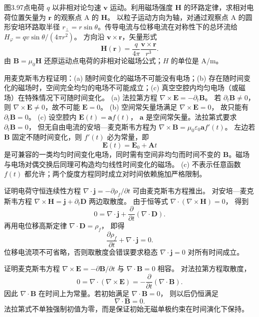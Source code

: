 图3.97点电荷 $q$ 以非相对论匀速 $\bm v$ 运动。利用磁场强度 $\bm H$ 的环路定律，求相对电荷位置矢量为 $\bm r$ 的观察点 A 的 $\bm H$。
\exsolution
以粒子运动方向为轴，对通过观察点 A 的圆形安培环路取半径 $r_\perp=r\sin\theta$。传导电流与位移电流在对称性下的总环流给
$H_\varphi=qv\sin\theta/(4\pi r^2)$。
方向沿 $\bm v\times\bm r$，矢量形式
\[
\boxed{\bm H(\bm r)=\frac{q}{4\pi}
\frac{\bm v\times\bm r}{r^3}}.
\]
\excheck 由 $\bm B=\mu_0\bm H$ 还原运动点电荷的非相对论磁场公式；$H$ 的单位是 A/m。

用麦克斯韦方程证明：(a) 随时间变化的磁场不可能没有电场；(b) 存在随时间变化的磁场时，空间完全均匀的电场不可能成立；(c) 真空空腔内均匀电场（或磁场）在特殊情况下可随时间变化。
\exsolution
(a) 法拉第方程
$\nabla\times\bm E=-\partial_t\bm B$。
若 $\partial_t\bm B\ne0$，则
$\nabla\times\bm E\ne0$，故不可能 $\bm E=0$。
(b) 空间常矢量场满足 $\nabla\times\bm E=0$，
故只能有 $\partial_t\bm B=0$。
(c) 设空腔内 $\bm E(t)=\bm a f(t)$，
$\bm a$ 是空间常矢量。法拉第式要求
$\partial_t\bm B=0$，
但无自由电流的安培—麦克斯韦方程为
$\nabla\times\bm B=\mu_0\varepsilon_0\bm a f'(t)$。
左边若 $\bm B$ 固定不随时间变化，则 $f'(t)$ 必为常量，即
\[
\boxed{\bm E(t)=\bm E_0+\bm A t}
\]
是可兼容的一类均匀时间变化电场，同时需有空间非均匀而时间不变的 $\bm B$。磁场与电场对偶交换后同理可构造均匀线性时间变化的磁场。
\excheck (c) 不表示任意函数 $f(t)$ 都允许；两个旋度方程同时成立对时间依赖施加严格限制。

证明电荷守恒连续性方程
$\nabla\cdot\bm j=-\partial\rho_f/\partial t$
可由麦克斯韦方程推出。
\exsolution
对安培—麦克斯韦方程
$\nabla\times\bm H=\bm j+\partial_t\bm D$
两边取散度。
由于恒等式
$\nabla\cdot(\nabla\times\bm H)=0$，
得到
\[
0=\nabla\cdot\bm j+
\frac{\partial}{\partial t}(\nabla\cdot\bm D).
\]
再用电位移高斯定律
$\nabla\cdot\bm D=\rho_f$，
即得
\[
\boxed{\frac{\partial\rho_f}{\partial t}
+\nabla\cdot\bm j=0}.
\]
\excheck 位移电流项不可省略，否则取散度会错误要求稳态 $\nabla\cdot\bm j=0$ 对所有时间成立。

证明麦克斯韦方程
$\nabla\times\bm E=-\partial\bm B/\partial t$
与 $\nabla\cdot\bm B=0$ 相容。
\exsolution
对法拉第方程取散度，
\[
0=\nabla\cdot(\nabla\times\bm E)
=-\frac{\partial}{\partial t}(\nabla\cdot\bm B).
\]
因此
$\nabla\cdot\bm B$ 在时间上为常量。若初始满足
$\nabla\cdot\bm B=0$，
则以后仍恒满足
\[
\boxed{\nabla\cdot\bm B=0}.
\]
\excheck 法拉第式不单独强制初值为零，而是保证初始无磁单极约束在时间演化下保持。

